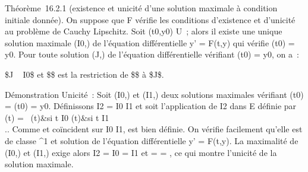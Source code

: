 Théorème~16.2.1 (existence et unicité d'une solution maximale à
condition initiale donnée). On suppose que F vérifie les conditions
d'existence et d'unicité au problème de Cauchy Lipschitz. Soit
(t0,y0) \in U~; alors il existe une unique solution
maximale (I0,) de l'équation différentielle y' =
F(t,y) qui vérifie (t0) = y0. Pour toute
solution (J,\psi) de l'équation différentielle vérifiant \psi(t0) =
y0, on a~:

\text\$J \subset~ I0\$ et \$\psi\$ est la restriction
de \$\$ à \$J\$.

Démonstration Unicité~: Soit (I0,) et
(I1,) deux solutions maximales vérifiant
(t0) = (t0) = y0.
Définissons I2 = I0 \cup I1 et soit
 l'application de I2 dans E définie par
(t) = \left \
\cases {}(t)&si t \in I0
\cr {}(t)&si t \in I1\\ 
\right .. Comme  et  coïncident
sur I0 \bigcap I1,  est bien définie. On
vérifie facilement qu'elle est de classe ^1 et solution de
l'équation différentielle y' = F(t,y). La maximalité de
(I0,) et (I1,) exige alors
I2 = I0 = I1 et  =
 = , ce qui montre l'unicité de la solution
maximale.

